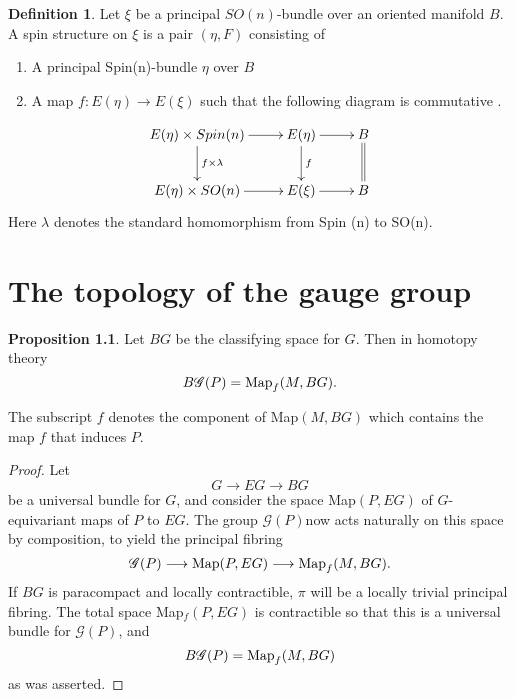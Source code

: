 \documentclass[A4,11pt,oneside]{book}
\theoremstyle{definition}
\newtheorem{defi}{Definition}
\newtheorem{prop}{Proposition}
\begin{document}
\begin{defi}
Let $\xi$ be a principal $SO(n)$-bundle over an oriented manifold $B$. A spin structure on $\xi$ is a pair $(\eta,F)$ consisting of 
\begin{enumerate}
\item A principal Spin(n)-bundle $\eta$ over $B$
\item A map $f:E(\eta)\rightarrow E(\xi)$ such that the following diagram is commutative .
\end{enumerate}
\begin{displaymath}
\xymatrix{ 
E(\eta)\times Spin(n) \ar[r]\ar[d]^{f\times\lambda} &E(\eta)\ar[d]^{f}\ar[r]& B\ar@{=}[d]\\
E(\eta)\times SO(n)\ar[r] &E(\xi)\ar[r]& B
}
\end{displaymath}
Here $\lambda$ denotes the standard homomorphism from Spin (n) to SO(n).
\end{defi}

\chapter{The topology of the gauge group}


\begin{prop}
Let $BG$ be the classifying space for $G$. Then in homotopy theory
\begin{equation*}
B\mathcal{G}(P)={\rm{Map}}_f(M,BG).
\end{equation*}
\end{prop}
The subscript $f$ denotes the component of Map$(M,BG)$ which contains the map $f$ that induces $P$. 
\begin{proof}
Let 
\begin{equation*}
G\rightarrow EG\rightarrow BG
\end{equation*}
be a universal bundle for $G$, and consider the space Map$(P,EG)$ of $G$-equivariant maps of $P$ to $EG$. The group $\mathcal G(P)$now acts naturally on this space by composition, to yield the principal fibring
\begin{equation*}
\mathcal G(P)\longrightarrow {\rm{Map}}(P,EG)\longrightarrow {\rm{Map}}_f(M,BG).
\end{equation*}
If $BG$ is paracompact and locally contractible, $\pi$ will be a locally trivial principal fibring. The total space Map$_f(P,EG)$ is contractible so that this is a universal bundle for $\mathcal G(P)$, and
\begin{equation*}
B\mathcal G(P)={\rm Map}_f(M,BG)
\end{equation*}
as was asserted. 

\end{proof}
\end{document}
